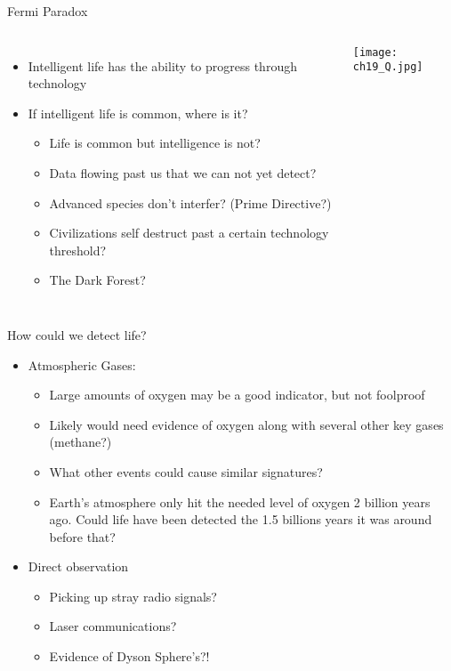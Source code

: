 \documentclass[pdf,aspectratio=169]{beamer}
\begin{document}
\begin{frame}{Fermi Paradox}
  \begin{columns}
	\begin{itemize}
	  \item Intelligent life has the ability to progress through technology
	  \item If intelligent life is common, where is it?
		\begin{itemize}
		  \item Life is common but intelligence is not?
		  \item Data flowing past us that we can not yet detect?
		  \item Advanced species don't interfer? (Prime Directive?)
		  \item Civilizations self destruct past a certain technology threshold?
		  \item The Dark Forest?
		\end{itemize}
	\end{itemize}
	\begin{center}
	  \texttt{[image: ch19\_Q.jpg]}
	\end{center}
  \end{columns}
\end{frame}

\begin{frame}{How could we detect life?}
  \begin{itemize}
	\item Atmospheric Gases:
	  \begin{itemize}
		\item Large amounts of oxygen may be a good indicator, but not foolproof
		\item Likely would need evidence of oxygen along with several other key gases (methane?)
		\item What other events could cause similar signatures?
		\item Earth's atmosphere only hit the needed level of oxygen 2 billion years ago. Could life have been detected the 1.5 billions years it was around before that?
	  \end{itemize}
	\item Direct observation
	  \begin{itemize}
		\item Picking up stray radio signals?
		\item Laser communications?
		\item Evidence of Dyson Sphere's?!
	  \end{itemize}
  \end{itemize}
\end{frame}
\end{document}
